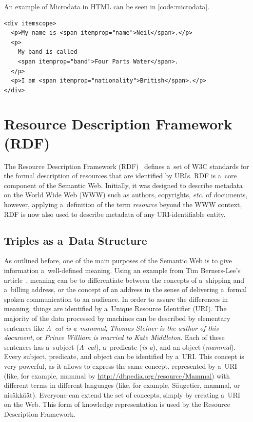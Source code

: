 An example of Microdata in HTML can be seen in \autoref{code:microdata}.

\begin{lstlisting}[caption={
  [Sample code snippet with Microdata mark-up.]
  {Sample code snippet with Microdata mark-up.
   Source: \url{http://www.w3.org/TR/microdata/}.}},
  label={code:microdata}]
<div itemscope>
  <p>My name is <span itemprop="name">Neil</span>.</p>
  <p>
    My band is called
    <span itemprop="band">Four Parts Water</span>.
  </p>
  <p>I am <span itemprop="nationality">British</span>.</p>
</div>
\end{lstlisting}

\section{Resource Description Framework (RDF)} \label{sec:rdf}

The Resource Description Framework (RDF)~\cite{klyne2004rdf}
defines a~set of W3C standards for the formal description of
resources that are identified by URIs.
RDF is a~core component of the Semantic Web.
Initially, it was designed to describe metadata
on the World Wide Web (WWW) such as authors,
copyrights, \emph{etc.} of documents, however,
applying a~definition of the term \emph{resource}
beyond the WWW context,
RDF is now also used to describe metadata
of any URI-identifiable entity.

\subsection{Triples as a~Data Structure}

As outlined before, one of the main purposes of the Semantic Web
is to give information a~well-defined meaning.
Using an example from Tim Berners-Lee’s
article~\cite{bernerslee2001semanticweb},
meaning can be to differentiate between the concepts of
a~shipping and a~billing address,
or the concept of an address in the sense of
delivering a~formal spoken communication to an audience.
In order to assure the differences in meaning,
things are identified by a~Unique Resource Identifier (URI).
The majority of the data processed by machines
can be described by elementary sentences like
\emph{A~cat is a~mammal},
\emph{Thomas Steiner is the author of this document},
or \emph{Prince William is married to Kate Middleton}.
Each of these sentences has a~subject (\emph{A~cat}),
a~predicate (\emph{is a}), and an object (\emph{mammal}).
Every subject, predicate, and object can be identified by a~URI.
This concept is very powerful,
as it allows to express the same concept,
represented by a~URI (like, for example, mammal by
\url{http://dbpedia.org/resource/Mammal})
with different terms in different languages
(like, for example, Säugetier, mammal, or nisäkkäät).
Everyone can extend the set of concepts,
simply by creating a~URI on the Web.
This form of knowledge representation
is used by the Resource Description Framework.

